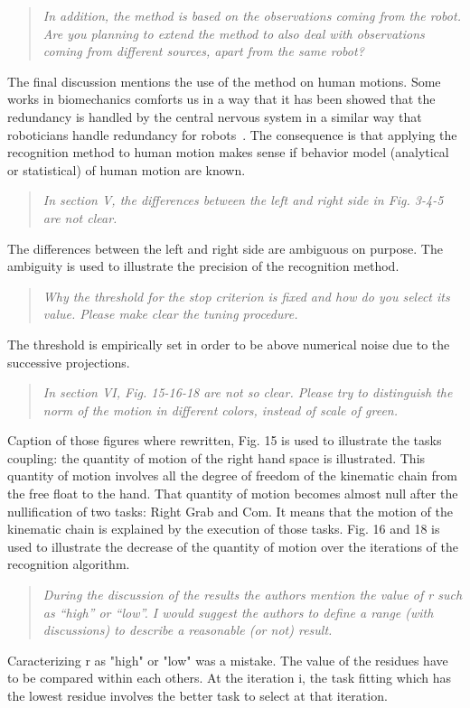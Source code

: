 \documentclass[11pt]{article}
\begin{document}
\begin{quote}
\textit{
  In addition, the method is based on the observations coming from the robot.  Are you planning to extend the method to also deal with observations coming from different sources, apart from the same robot? 
}
\end{quote}
The final discussion mentions the use of the method on human motions.
Some works in biomechanics comforts us in a way that it has been showed
that the redundancy is handled by the central nervous system in a similar 
way that roboticians handle redundancy for robots~\cite{jacquierbret09}.
The consequence is that applying the recognition method to human motion makes
sense if behavior model (analytical or statistical) of human motion are known.

\begin{quote}
\textit{
 In section V, the differences between the left and right side in Fig. 3-4-5 are not clear.
}
\end{quote}
The differences between the left and right side are ambiguous on purpose.
The ambiguity is used to illustrate the precision of the recognition method.
 
\begin{quote}
\textit{
 Why the threshold for the stop criterion is fixed and how do you select its value.  Please make clear the tuning procedure.
}
\end{quote}
The threshold is empirically set in order to be above numerical noise
due to the successive projections. 

\begin{quote}
\textit{
In section VI, Fig. 15-16-18 are not so clear. Please try to distinguish the norm of the motion in different colors, instead of scale of green.
}
\end{quote}
Caption of those figures where rewritten, Fig. 15 is used to illustrate
the tasks coupling: the quantity of motion of the right hand space is illustrated.
This quantity of motion involves all the degree of freedom of the kinematic chain from
the free float to the hand. That quantity of motion becomes almost null after
the nullification of two tasks: Right Grab and Com.
It means that the motion of the kinematic chain is explained by the execution of those tasks.
Fig. 16 and 18 is used to illustrate the decrease of the quantity of motion over the iterations of the recognition
algorithm.

\begin{quote}
\textit{
 During the discussion of the results the authors mention the value of r such as “high” or “low”. I would suggest the authors to define a range (with discussions) to describe a reasonable (or not) result.
}
\end{quote}
Caracterizing r as "high" or "low" was a mistake. The value of the residues have
to be compared within each others. At the iteration i, the task fitting which has the lowest 
residue involves the better task to select at that iteration.
\end{document}
